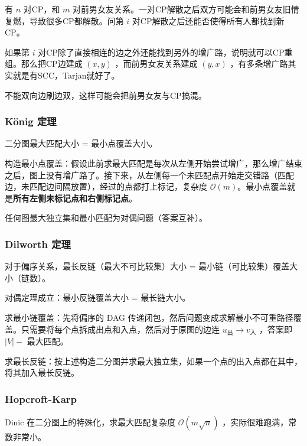 有 $n$ 对CP，和 $m$ 对前男女友关系。一对CP解散之后双方可能会和前男女友旧情复燃，导致很多CP都解散。问第 $i$ 对CP解散之后还能否使得所有人都找到新CP。

如果第 $i$ 对CP除了直接相连的边之外还能找到另外的增广路，说明就可以CP重组。那么把CP边建成 $(x,y)$ ，而前男女友关系建成 $(y,x)$ ，有多条增广路其实就是有SCC，Tarjan就好了。

不能双向边刷边双，这样可能会把前男女友与CP搞混。

\vspace{-0.2cm}

\subsubsection{König 定理}

二分图最大匹配大小 = 最小点覆盖大小。

构造最小点覆盖：假设此前求最大匹配是每次从左侧开始尝试增广，那么增广结束之后，图上没有增广路了。接下来，从左侧每一个未匹配点开始走交错路（匹配边，未匹配边间隔放置），经过的点都打上标记，复杂度 $\mathcal{O}(m)$。最小点覆盖就是\textbf{所有左侧未标记点和右侧标记点}。

任何图最大独立集和最小匹配为对偶问题（答案互补）。

\vspace{-0.2cm}

\subsubsection{Dilworth 定理}

对于偏序关系，最长反链（最大不可比较集）大小 = 最小链（可比较集）覆盖大小（链数）。

对偶定理成立：最小反链覆盖大小 = 最长链大小。

\vspace{0.2cm}

求最小链覆盖：先将偏序的 DAG 传递闭包，然后问题变成求解最小不可重路径覆盖。只需要将每个点拆成出点和入点，然后对于原图的边连 $u_{出}\to v_{入}$ ，答案即 $|V|-$ 最大匹配。

\vspace{0.2cm}

求最长反链：按上述构造二分图并求最大独立集，如果一个点的出入点都在其中，将其加入最长反链。

\subsubsection{Hopcroft-Karp}

Dinic 在二分图上的特殊化，求最大匹配复杂度 $\mathcal{O}(m\sqrt n)$ ，实际很难跑满，常数非常小。

